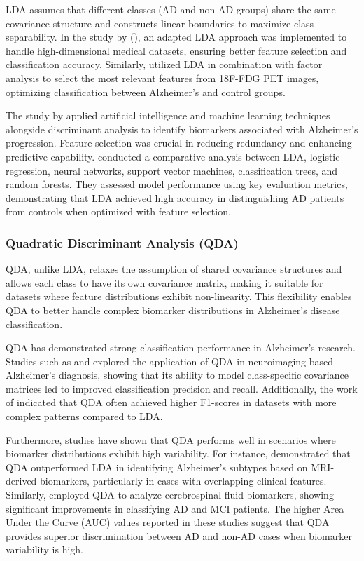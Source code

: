 \documentclass[12pt]{article}
\begin{document}
LDA assumes that different classes (AD and non-AD groups) share the same covariance structure and constructs linear boundaries to maximize class separability. In the study by (\cite{le2020_lda_highdimensional}), an adapted LDA approach was implemented to handle high-dimensional medical datasets, ensuring better feature selection and
classification accuracy. Similarly, \cite{salasgonzalez2010_factor_analysis_lda} utilized LDA in combination with factor analysis to select the most relevant features from 18F-FDG PET images, optimizing classification between Alzheimer's and control groups.

The study by \cite{yilmaz2021_metabolic_biomarkers_ad} applied artificial intelligence and machine learning techniques alongside discriminant analysis to identify biomarkers associated with Alzheimer's progression. Feature selection was crucial in reducing redundancy and enhancing predictive capability. \cite{maroco2011_data_mining_dementia}
conducted a comparative analysis between LDA, logistic regression, neural networks, support vector machines, classification trees, and random forests. They assessed model performance using key evaluation metrics, demonstrating that LDA achieved high accuracy in distinguishing AD patients from controls when optimized with feature selection.

\subsubsection{Quadratic Discriminant Analysis (QDA)}
\noindent

QDA, unlike LDA, relaxes the assumption of shared covariance structures and allows each class to have its own covariance matrix, making it suitable for datasets where feature distributions exhibit non-linearity. This flexibility enables QDA to better handle complex biomarker distributions in Alzheimer's disease classification.

QDA has demonstrated strong classification performance in Alzheimer's research. Studies such as \cite{zhang2017_qda_neuroimaging} and \cite{pereira2020_qda_mri} explored the application of QDA in neuroimaging-based Alzheimer's diagnosis, showing that its ability to model class-specific covariance matrices led to improved classification precision
and recall. Additionally, the work of \cite{maroco2011_data_mining_dementia} indicated that QDA often achieved higher F1-scores in datasets with more complex patterns compared to LDA.

Furthermore, studies have shown that QDA performs well in scenarios where biomarker distributions exhibit high variability. For instance, \cite{lee2015_qda_mri_biomarker} demonstrated that QDA outperformed LDA in identifying Alzheimer's subtypes based on MRI-derived biomarkers, particularly in cases with overlapping clinical features. Similarly, 
\cite{garciarodriguez2016_qda_csf} employed QDA to analyze cerebrospinal fluid biomarkers, showing significant improvements in classifying AD and MCI patients. The higher Area Under the Curve (AUC) values reported in these studies suggest that QDA provides superior discrimination between AD and non-AD cases when biomarker variability is high.
\end{document}
